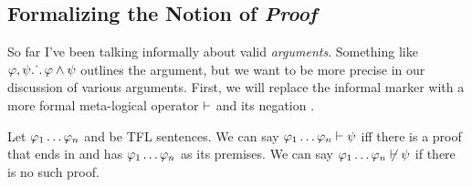 \subsection{Formalizing the Notion of \emph{Proof}}

So far I've been talking informally about valid \emph{arguments}. Something
like $\varphi,\psi\ldotp\dot{}\,\ldotp\varphi\wedge\psi$ outlines the argument, but we
want to be more precise in our discussion of various arguments. First, we
will replace the informal \therefore marker with a more formal meta-logical
operator $\vdash$ and its negation \enotproves.

\begin{definition}[Turnstiles]
  \label{def:turnstiles}
  Let $\varphi_1\dots\varphi_n$ and \spsi be TFL sentences. We can say
  $\varphi_1\dots\varphi_n\vdash\psi$ iff there is a proof that ends in \spsi
  and has $\varphi_1\dots\varphi_n$ as its premises. We can say
  $\varphi_1\dots\varphi_n\not\vdash\psi$ if there is no such proof.
\end{definition}

